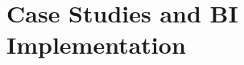 \documentclass[aspectratio=169, table]{beamer}
\begin{document}







\section{Case Studies and BI Implementation}
\end{document}
